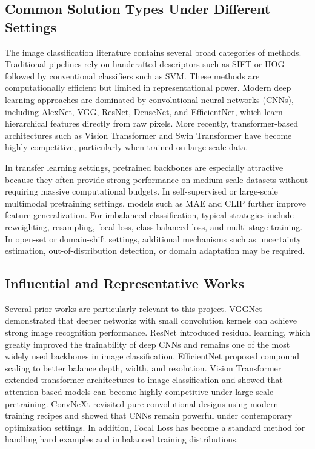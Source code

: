 \documentclass[11pt,a4paper]{article}
\begin{document}
\subsection{Common Solution Types Under Different Settings}
The image classification literature contains several broad categories of methods. Traditional pipelines rely on handcrafted descriptors such as SIFT or HOG followed by conventional classifiers such as SVM. These methods are computationally efficient but limited in representational power. Modern deep learning approaches are dominated by convolutional neural networks (CNNs), including AlexNet, VGG, ResNet, DenseNet, and EfficientNet, which learn hierarchical features directly from raw pixels. More recently, transformer-based architectures such as Vision Transformer and Swin Transformer have become highly competitive, particularly when trained on large-scale data.

In transfer learning settings, pretrained backbones are especially attractive because they often provide strong performance on medium-scale datasets without requiring massive computational budgets. In self-supervised or large-scale multimodal pretraining settings, models such as MAE and CLIP further improve feature generalization. For imbalanced classification, typical strategies include reweighting, resampling, focal loss, class-balanced loss, and multi-stage training. In open-set or domain-shift settings, additional mechanisms such as uncertainty estimation, out-of-distribution detection, or domain adaptation may be required.

\subsection{Influential and Representative Works}
Several prior works are particularly relevant to this project. VGGNet demonstrated that deeper networks with small convolution kernels can achieve strong image recognition performance. ResNet introduced residual learning, which greatly improved the trainability of deep CNNs and remains one of the most widely used backbones in image classification. EfficientNet proposed compound scaling to better balance depth, width, and resolution. Vision Transformer extended transformer architectures to image classification and showed that attention-based models can become highly competitive under large-scale pretraining. ConvNeXt revisited pure convolutional designs using modern training recipes and showed that CNNs remain powerful under contemporary optimization settings. In addition, Focal Loss has become a standard method for handling hard examples and imbalanced training distributions.
\end{document}
